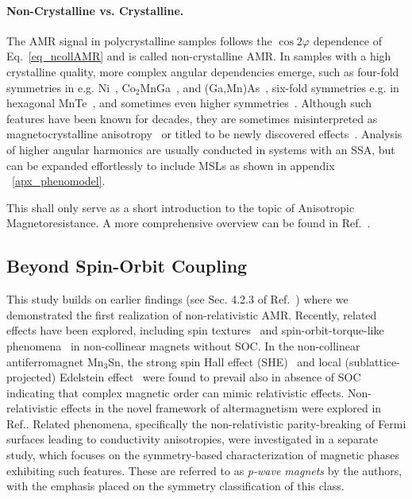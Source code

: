 \documentclass[prb,showpacs,amsmath,amssymb,superscriptaddress,twocolumn,floatfix]{revtex4-1}
\begin{document}
\paragraph{Non-Crystalline vs. Crystalline.} The AMR signal in polycrystalline samples follows the $\cos 2\varphi$ dependence of Eq.~\ref{eq_ncollAMR} and is called non-crystalline AMR. In samples with a high crystalline quality, more complex angular dependencies emerge, such as four-fold symmetries in e.g. Ni~\cite{Doring:1938}, Co$_2$MnGa~\cite{Sato:2019,Ritzinger:2021}, and (Ga,Mn)As~\cite{DeRanieri:2008}, six-fold symmetries e.g. in hexagonal MnTe~\cite{Kriegner:2017, Gonzalez-Betancourt:2024}, and sometimes even higher symmetries~\cite{Gonzalez-Betancourt:2024, NamHai:2012}. Although such features have been known for decades, they are sometimes misinterpreted as magnetocrystalline anisotropy~\cite{Ritzinger:2023} or titled to be newly discovered effects~\cite{Dong:2023}. Analysis of higher angular harmonics are usually conducted in systems with an SSA, but can be expanded effortlessly to include MSLs as shown in appendix ~\ref{apx_phenomodel}.

This shall only serve as a short introduction to the topic of Anisotropic Magnetoresistance. A more comprehensive overview can be found in Ref.~\cite{Ritzinger:2023}.

\subsection{Beyond Spin-Orbit Coupling}

This study builds on earlier findings (see Sec. 4.2.3 of Ref.~\cite{Ritzinger:2023}) where we demonstrated the first realization of non-relativistic AMR. Recently, related effects have been explored, including spin textures~\cite{Bonbien:2022} and spin-orbit-torque-like phenomena~\cite{Gonzalez-Hernandez:2024} in non-collinear magnets without SOC. In the non-collinear antiferromagnet Mn$_3$Sn, the strong spin Hall effect (SHE)~\cite{Zhou:2020, Zhang:2017} and local (sublattice-projected) Edelstein effect~\cite{Gonzalez-Hernandez:2024} were found to prevail also in absence of SOC~\cite{Manna:2018, Gonzalez-Hernandez:2024} indicating that complex magnetic order can mimic relativistic effects. Non-relativistic effects in the novel framework of altermagnetism were explored in Ref.\cite{Jungwirth:2024}. Related phenomena, specifically the non-relativistic parity-breaking of Fermi surfaces leading to conductivity anisotropies, were investigated in a separate study\cite{BirkHellens:2023}, which focuses on the symmetry-based characterization of magnetic phases exhibiting such features. These are referred to as \textit{p-wave magnets} by the authors, with the emphasis placed on the symmetry classification of this class.
\end{document}
